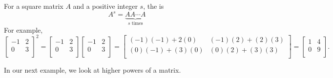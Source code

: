 \begin{defn}
\begin{apart}
        \item For a square matrix $A$ and a positive integer $s$, the  is $$A^s= \underbrace{AA\cdots A}_{s \text{ times}}$$
        For example,
           $$\left[ \begin{array}{rr} -1 & 2 \\ 0 & 3 \\ \end{array} \right]^2
           = \left[ \begin{array}{rr} -1 & 2 \\ 0 & 3 \\ \end{array} \right]\left[ \begin{array}{rr} -1 & 2 \\ 0 & 3 \\ \end{array} \right]
           =\left[ \begin{array}{cc} (-1)(-1)+2(0) & (-1)(2)+(2)(3)\\ (0)(-1)+(3)(0) & (0)(2)+(3)(3) \\ \end{array} \right]
           = \left[ \begin{array}{rr} 1 & 4 \\ 0 & 9 \\ \end{array} \right]
           .$$
    \end{apart}
\end{defn}

In our next example, we look at higher powers of a matrix.

